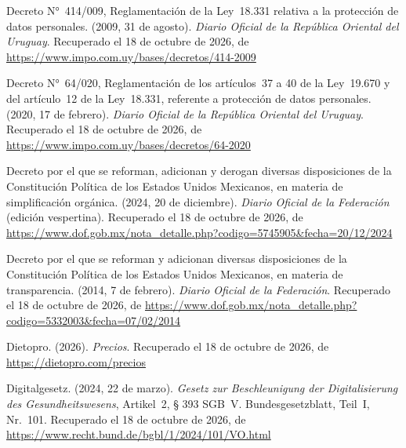 \documentclass[12pt, a4paper]{article}
\begin{document}
\begin{list}{}{\setlength{\leftmargin}{1.27cm}\setlength{\itemindent}{-1.27cm}%
  \setlength{\labelwidth}{0pt}\setlength{\labelsep}{0pt}\setlength{\itemsep}{6pt}}
\item Decreto N°~414/009, Reglamentación de la Ley~18.331 relativa
  a la protección de datos personales. (2009, 31 de agosto).
  \textit{Diario Oficial de la República Oriental del Uruguay}.
  Recuperado el 18 de octubre de 2026, de \url{https://www.impo.com.uy/bases/decretos/414-2009}


\item Decreto N°~64/020, Reglamentación de los artículos~37 a 40
  de la Ley~19.670 y del artículo~12 de la Ley~18.331, referente a
  protección de datos personales. (2020, 17 de febrero).
  \textit{Diario Oficial de la República Oriental del Uruguay}.
  Recuperado el 18 de octubre de 2026, de \url{https://www.impo.com.uy/bases/decretos/64-2020}
 

\item Decreto por el que se reforman, adicionan y derogan diversas
  disposiciones de la Constitución Política de los Estados Unidos
  Mexicanos, en materia de simplificación orgánica. (2024, 20 de
  diciembre). \textit{Diario Oficial de la Federación} (edición
  vespertina). Recuperado el 18 de octubre de 2026, de \url{https://www.dof.gob.mx/nota_detalle.php?codigo=5745905&fecha=20/12/2024}

\item Decreto por el que se reforman y adicionan diversas
  disposiciones de la Constitución Política de los Estados Unidos
  Mexicanos, en materia de transparencia. (2014, 7 de febrero).
  \textit{Diario Oficial de la Federación}.
  Recuperado el 18 de octubre de 2026, de \url{https://www.dof.gob.mx/nota_detalle.php?codigo=5332003&fecha=07/02/2014}
 

\item Dietopro. (2026). \textit{Precios}.
  Recuperado el 18 de octubre de 2026, de \url{https://dietopro.com/precios}

\item Digitalgesetz. (2024, 22 de marzo). \textit{Gesetz zur
  Beschleunigung der Digitalisierung des Gesundheitswesens},
  Artikel~2, § 393 SGB~V. Bundesgesetzblatt, Teil~I, Nr.~101.
  Recuperado el 18 de octubre de 2026, de \url{https://www.recht.bund.de/bgbl/1/2024/101/VO.html}


\end{list}
\end{document}

